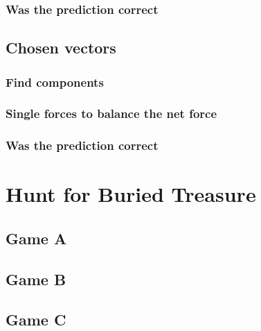 \documentclass[11pt, letterpaper, includehead]{article}
\begin{document}
\subsubsection{Was the prediction correct} %

\subsection{Chosen vectors} %

\subsubsection{Find components} %

\subsubsection{Single forces to balance the net force} %

\subsubsection{Was the prediction correct} %

\section{Hunt for Buried Treasure} %
\subsection{Game A} %
\subsection{Game B} %
\subsection{Game C} %
\end{document}
